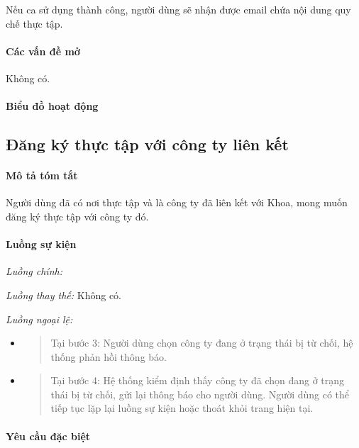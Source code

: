 \documentclass[./../main.tex]{subfiles}
\begin{document}
Nếu ca sử dụng thành công, người dùng sẽ nhận được email chứa nội dung
quy chế thực tập.

\paragraph*{Các vấn đề mở}

Không có.

\paragraph*{Biểu đồ hoạt động}

\subsection{Đăng ký thực tập với công ty liên kết}

\paragraph*{Mô tả tóm tắt}

Người dùng đã có nơi thực tập và là công ty đã liên kết với Khoa, mong
muốn đăng ký thực tập với công ty đó.

\paragraph*{Luồng sự kiện}

\emph{Luồng chính:}

\emph{Luồng thay thế:} Không có.

\emph{Luồng ngoại lệ:}

\begin{itemize}
\item
  \begin{quote}
  Tại bước 3: Người dùng chọn công ty đang ở trạng thái bị từ chối, hệ
  thống phản hồi thông báo.
  \end{quote}
\item
  \begin{quote}
  Tại bước 4: Hệ thống kiểm định thấy công ty đã chọn đang ở trạng thái
  bị từ chối, gửi lại thông báo cho người dùng. Người dùng có thể tiếp
  tục lặp lại luồng sự kiện hoặc thoát khỏi trang hiện tại.
  \end{quote}
\end{itemize}

\paragraph*{Yêu cầu đặc biệt}
\end{document}
